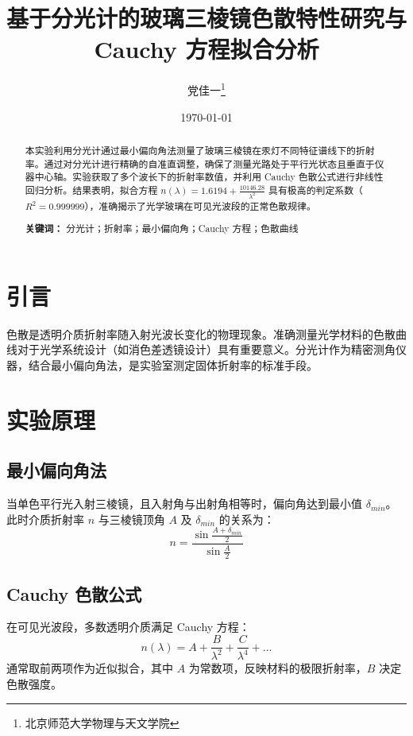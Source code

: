 \documentclass[10pt,twocolumn,a4paper]{article}
\title{\Large \bfseries 基于分光计的玻璃三棱镜色散特性研究与 Cauchy 方程拟合分析}
\author{党佳一\thanks{北京师范大学物理与天文学院}}
\date{\today}
\begin{document}
	
	\maketitle
	
	\renewcommand{\abstractname}{摘 \ 要}
	\begin{abstract}
		本实验利用分光计通过最小偏向角法测量了玻璃三棱镜在汞灯不同特征谱线下的折射率。通过对分光计进行精确的自准直调整，确保了测量光路处于平行光状态且垂直于仪器中心轴。实验获取了多个波长下的折射率数值，并利用 Cauchy 色散公式进行非线性回归分析。结果表明，拟合方程 $n(\lambda) = 1.6194 + \frac{10146.28}{\lambda^2}$ 具有极高的判定系数（$R^2 = 0.999999$），准确揭示了光学玻璃在可见光波段的正常色散规律。
		\par \textbf{关键词：} 分光计；折射率；最小偏向角；Cauchy 方程；色散曲线
	\end{abstract}
	
	
	\section{引言}
	色散是透明介质折射率随入射光波长变化的物理现象。准确测量光学材料的色散曲线对于光学系统设计（如消色差透镜设计）具有重要意义。分光计作为精密测角仪器，结合最小偏向角法，是实验室测定固体折射率的标准手段。
	
	\section{实验原理}
	\subsection{最小偏向角法}
	当单色平行光入射三棱镜，且入射角与出射角相等时，偏向角达到最小值 $\delta_{min}$。此时介质折射率 $n$ 与三棱镜顶角 $A$ 及 $\delta_{min}$ 的关系为：
	\begin{equation}
		n = \frac{\sin \frac{A + \delta_{min}}{2}}{\sin \frac{A}{2}}
	\end{equation}
	
	\subsection{Cauchy 色散公式}
	在可见光波段，多数透明介质满足 Cauchy 方程：
	\begin{equation}
		n(\lambda) = A + \frac{B}{\lambda^2} + \frac{C}{\lambda^4} + \dots
	\end{equation}
	通常取前两项作为近似拟合，其中 $A$ 为常数项，反映材料的极限折射率，$B$ 决定色散强度。
	
\end{document}
